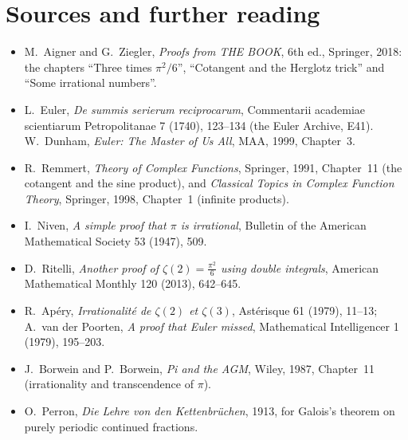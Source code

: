 \section*{Sources and further reading}

\begin{itemize}
\item M.~Aigner and G.~Ziegler, \emph{Proofs from THE BOOK}, 6th ed., Springer, 2018: the chapters ``Three times $\pi^2/6$'',
``Cotangent and the Herglotz trick'' and ``Some irrational numbers''.
\item L.~Euler, \emph{De summis serierum reciprocarum}, Commentarii academiae scientiarum Petropolitanae 7 (1740), 123--134
(the Euler Archive, E41). W.~Dunham, \emph{Euler: The Master of Us All}, MAA, 1999, Chapter~3.
\item R.~Remmert, \emph{Theory of Complex Functions}, Springer, 1991, Chapter~11 (the cotangent and the sine product), and
\emph{Classical Topics in Complex Function Theory}, Springer, 1998, Chapter~1 (infinite products).
\item I.~Niven, \emph{A simple proof that $\pi$ is irrational}, Bulletin of the American Mathematical Society 53 (1947), 509.
\item D.~Ritelli, \emph{Another proof of $\zeta(2)=\frac{\pi^2}6$ using double integrals}, American Mathematical Monthly 120
(2013), 642--645.
\item R.~Ap\'ery, \emph{Irrationalit\'e de $\zeta(2)$ et $\zeta(3)$}, Ast\'erisque 61 (1979), 11--13; A.~van der Poorten, \emph{A proof that
Euler missed}, Mathematical Intelligencer 1 (1979), 195--203.
\item J.~Borwein and P.~Borwein, \emph{Pi and the AGM}, Wiley, 1987, Chapter~11 (irrationality and transcendence of $\pi$).
\item O.~Perron, \emph{Die Lehre von den Kettenbr\"uchen}, 1913, for Galois's theorem on purely periodic continued fractions.
\end{itemize}

